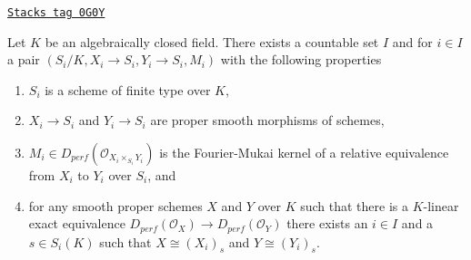 \begin{lemma}
\label{equiv-lemma-countable-equivs}
\href{https://stacks.math.columbia.edu/tag/0G0Y}{\texttt{Stacks tag 0G0Y}}

Let $K$ be an algebraically closed field. There exists a countable set $I$
and for $i \in I$ a pair $(S_i/K, X_i \to S_i, Y_i \to S_i, M_i)$
with the following properties
\begin{enumerate}
\item $S_i$ is a scheme of finite type over $K$,
\item $X_i \to S_i$ and $Y_i \to S_i$ are proper smooth
morphisms of schemes,
\item $M_i \in D_{perf}(\mathcal{O}_{X_i \times_{S_i} Y_i})$
is the Fourier-Mukai kernel of a relative equivalence from
$X_i$ to $Y_i$ over $S_i$, and
\item for any smooth proper schemes $X$ and $Y$ over $K$
such that there is a $K$-linear exact equivalence
$D_{perf}(\mathcal{O}_X) \to D_{perf}(\mathcal{O}_Y)$
there exists an $i \in I$ and a $s \in S_i(K)$
such that $X \cong (X_i)_s$ and $Y \cong (Y_i)_s$.
\end{enumerate}
\end{lemma}

